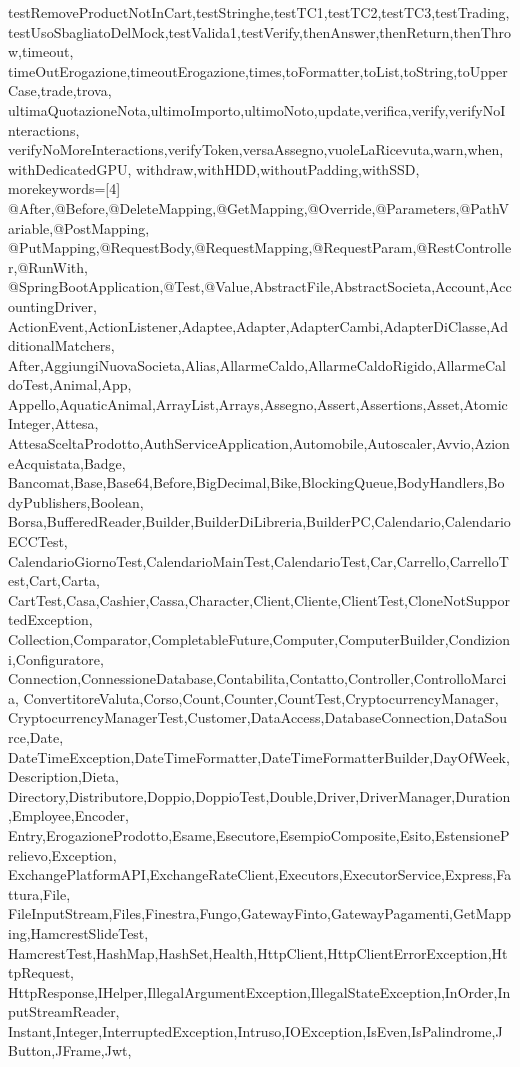 {{    testRemoveProductNotInCart,testStringhe,testTC1,testTC2,testTC3,testTrading,
    testUsoSbagliatoDelMock,testValida1,testVerify,thenAnswer,thenReturn,thenThrow,timeout,
    timeOutErogazione,timeoutErogazione,times,toFormatter,toList,toString,toUpperCase,trade,trova,
    ultimaQuotazioneNota,ultimoImporto,ultimoNoto,update,verifica,verify,verifyNoInteractions,
    verifyNoMoreInteractions,verifyToken,versaAssegno,vuoleLaRicevuta,warn,when,withDedicatedGPU,
    withdraw,withHDD,withoutPadding,withSSD},
  morekeywords=[4]{
    @After,@Before,@DeleteMapping,@GetMapping,@Override,@Parameters,@PathVariable,@PostMapping,
    @PutMapping,@RequestBody,@RequestMapping,@RequestParam,@RestController,@RunWith,
    @SpringBootApplication,@Test,@Value,AbstractFile,AbstractSocieta,Account,AccountingDriver,
    ActionEvent,ActionListener,Adaptee,Adapter,AdapterCambi,AdapterDiClasse,AdditionalMatchers,
    After,AggiungiNuovaSocieta,Alias,AllarmeCaldo,AllarmeCaldoRigido,AllarmeCaldoTest,Animal,App,
    Appello,AquaticAnimal,ArrayList,Arrays,Assegno,Assert,Assertions,Asset,AtomicInteger,Attesa,
    AttesaSceltaProdotto,AuthServiceApplication,Automobile,Autoscaler,Avvio,AzioneAcquistata,Badge,
    Bancomat,Base,Base64,Before,BigDecimal,Bike,BlockingQueue,BodyHandlers,BodyPublishers,Boolean,
    Borsa,BufferedReader,Builder,BuilderDiLibreria,BuilderPC,Calendario,CalendarioECCTest,
    CalendarioGiornoTest,CalendarioMainTest,CalendarioTest,Car,Carrello,CarrelloTest,Cart,Carta,
    CartTest,Casa,Cashier,Cassa,Character,Client,Cliente,ClientTest,CloneNotSupportedException,
    Collection,Comparator,CompletableFuture,Computer,ComputerBuilder,Condizioni,Configuratore,
    Connection,ConnessioneDatabase,Contabilita,Contatto,Controller,ControlloMarcia,
    ConvertitoreValuta,Corso,Count,Counter,CountTest,CryptocurrencyManager,
    CryptocurrencyManagerTest,Customer,DataAccess,DatabaseConnection,DataSource,Date,
    DateTimeException,DateTimeFormatter,DateTimeFormatterBuilder,DayOfWeek,Description,Dieta,
    Directory,Distributore,Doppio,DoppioTest,Double,Driver,DriverManager,Duration,Employee,Encoder,
    Entry,ErogazioneProdotto,Esame,Esecutore,EsempioComposite,Esito,EstensionePrelievo,Exception,
    ExchangePlatformAPI,ExchangeRateClient,Executors,ExecutorService,Express,Fattura,File,
    FileInputStream,Files,Finestra,Fungo,GatewayFinto,GatewayPagamenti,GetMapping,HamcrestSlideTest,
    HamcrestTest,HashMap,HashSet,Health,HttpClient,HttpClientErrorException,HttpRequest,
    HttpResponse,IHelper,IllegalArgumentException,IllegalStateException,InOrder,InputStreamReader,
    Instant,Integer,InterruptedException,Intruso,IOException,IsEven,IsPalindrome,JButton,JFrame,Jwt,
}}
